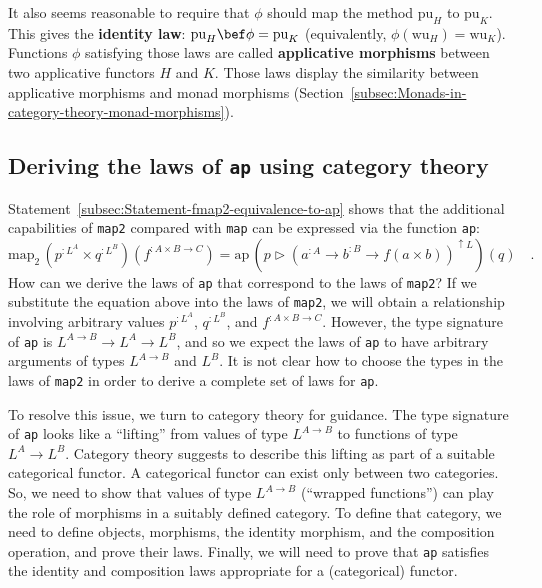 It also seems reasonable to require that $\phi$ should map the method
$\text{pu}_{H}$ to $\text{pu}_{K}$. This gives the \textbf{identity
law}: $\text{pu}_{H}\bef\phi=\text{pu}_{K}$ (equivalently, $\phi(\text{wu}_{H})=\text{wu}_{K}$).
Functions $\phi$ satisfying those laws are called \textbf{applicative
morphisms} between two applicative functors
$H$ and $K$. Those laws display the similarity between applicative
morphisms and monad morphisms (Section~\ref{subsec:Monads-in-category-theory-monad-morphisms}).

\subsection{Deriving the laws of \texttt{ap} using category theory}

Statement~\ref{subsec:Statement-fmap2-equivalence-to-ap} shows that
the additional capabilities of \lstinline!map2! compared with \lstinline!map!
can be expressed via the function \lstinline!ap!:
\[
\text{map}_{2}\,(p^{:L^{A}}\times q^{:L^{B}})(f^{:A\times B\rightarrow C})=\text{ap}\,(p\triangleright(a^{:A}\rightarrow b^{:B}\rightarrow f(a\times b))^{\uparrow L})(q)\quad.
\]
How can we derive the laws of \lstinline!ap! that correspond to the
laws of \lstinline!map2!? If we substitute the equation above into
the laws of \lstinline!map2!, we will obtain a relationship involving
arbitrary values $p^{:L^{A}}$, $q^{:L^{B}}$, and $f^{:A\times B\rightarrow C}$.
However, the type signature of \lstinline!ap! is $L^{A\rightarrow B}\rightarrow L^{A}\rightarrow L^{B}$,
and so we expect the laws of \lstinline!ap! to have arbitrary arguments
of types $L^{A\rightarrow B}$ and $L^{B}$. It is not clear how to
choose the types in the laws of \lstinline!map2! in order to derive
a complete set of laws for \lstinline!ap!.

To resolve this issue, we turn to category theory for guidance. The
type signature of \lstinline!ap! looks like a \textsf{``}lifting\textsf{''} from
values of type $L^{A\rightarrow B}$ to functions of type $L^{A}\rightarrow L^{B}$.
Category theory suggests to describe this lifting as part of a suitable
categorical functor.
A categorical functor can exist only between two categories. So, we
need to show that values of type $L^{A\rightarrow B}$ (\textsf{``}wrapped
functions\textsf{''}) can play the role of morphisms in a suitably defined
category. To define that category, we need to define objects, morphisms,
the identity morphism, and the composition operation, and prove their
laws. Finally, we will need to prove that \lstinline!ap! satisfies
the identity and composition laws appropriate for a (categorical)
functor.

